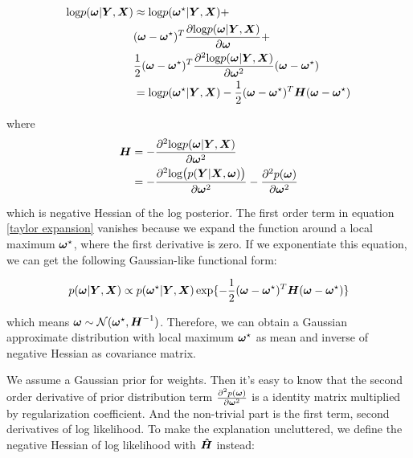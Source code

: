 \begin{equation}
\begin{aligned} \label{taylor expansion}
\text{log} p(\boldsymbol \omega| \boldsymbol Y, \boldsymbol X) &\approx 
\text{log}p(\boldsymbol \omega^\star|\boldsymbol Y, \boldsymbol X) + \\
&(\boldsymbol \omega - \boldsymbol \omega^\star)^T\frac{\partial \text{log} p(\boldsymbol \omega| \boldsymbol Y, \boldsymbol X)}{\partial \boldsymbol \omega} + \\
&\frac{1}{2}(\boldsymbol \omega - \boldsymbol \omega^\star)^T\frac{\partial^2\text{log} p(\boldsymbol \omega |\boldsymbol Y, \boldsymbol X)}{\partial \boldsymbol \omega^2}(\boldsymbol \omega - \boldsymbol \omega^\star)\\
&= \text{log}p(\boldsymbol \omega^\star|\boldsymbol Y, \boldsymbol X) - \frac{1}{2}(\boldsymbol \omega - \boldsymbol \omega^\star)^T\boldsymbol H(\boldsymbol \omega - \boldsymbol \omega^\star)
\end{aligned}
\end{equation}


where 
\[
\begin{aligned}
\boldsymbol H &= -\frac{\partial^2\text{log} p(\boldsymbol \omega|\boldsymbol Y, \boldsymbol X)}{\partial \boldsymbol \omega^2}\\
&=-\frac{\partial^2\text{log}\big(p(\boldsymbol Y|\boldsymbol X, \boldsymbol \omega)\big)}{\partial \boldsymbol \omega^2} - \frac{\partial^2p(\boldsymbol \omega)}{\partial\boldsymbol \omega^2}
\end{aligned}
\]

which is negative Hessian of the log posterior. The first order term in equation \ref{taylor expansion} vanishes because we expand the function around a local maximum $\boldsymbol \omega^\star$, where the first derivative is zero. If we exponentiate this equation, we can get the following Gaussian-like functional form: 

\begin{equation}
\begin{aligned}\label{gaussian form}
p(\boldsymbol \omega | \boldsymbol Y, \boldsymbol X) \propto p(\boldsymbol \omega^\star|\boldsymbol Y, \boldsymbol X)\exp\{-\frac{1}{2}(\boldsymbol \omega - \boldsymbol \omega^\star)^T\boldsymbol H (\boldsymbol \omega - \boldsymbol \omega^\star)\}
\end{aligned}
\end{equation}

which means $\boldsymbol \omega \sim \mathcal N(\boldsymbol \omega^\star, \boldsymbol H ^{-1})$. Therefore, we can obtain a Gaussian approximate distribution with local maximum $\boldsymbol \omega^\star$ as mean and inverse of negative Hessian as covariance matrix.

We assume a Gaussian prior for weights. Then it's easy to know that the second order derivative of prior distribution term $\frac{\partial^2p(\boldsymbol \omega)}{\partial\boldsymbol \omega^2}$ is a identity matrix multiplied by regularization coefficient. And the non-trivial part is the first term, second derivatives of log likelihood. To make the explanation uncluttered, we define the negative Hessian of log likelihood with $\boldsymbol{\hat{H}}$ instead:

